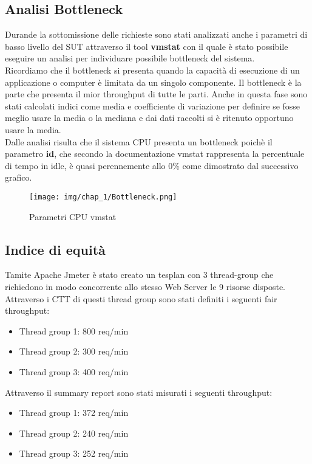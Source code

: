 \subsection{Analisi Bottleneck}
Durande la sottomissione delle richieste sono stati analizzati anche i parametri di basso livello del SUT attraverso il tool \textbf{vmstat} con il quale è stato possibile eseguire un analisi per individuare possibile bottleneck del sistema.\\
Ricordiamo che il bottleneck si presenta quando la capacità di esecuzione di un applicazione o computer è limitata da un singolo componente. Il bottleneck è la parte che presenta il mior throughput di tutte le parti. 
Anche in questa fase sono stati calcolati indici come media e coefficiente di variazione per definire se fosse meglio usare la media o la mediana e dai dati raccolti si è ritenuto opportuno usare la media.\\
Dalle analisi risulta che il sistema CPU presenta un bottleneck poichè il parametro \textbf{id}, che secondo la documentazione vmstat rappresenta la percentuale di tempo in idle, è quasi perennemente allo 0\% come dimostrato dal successivo grafico.
\begin{figure}[H]
    \centering
    \texttt{[image: img/chap\_1/Bottleneck.png]}
    \caption{Parametri CPU vmstat}
    \label{fig:bottleneck}
\end{figure}
\subsection{Indice di equità}
Tamite Apache Jmeter è stato creato un tesplan con 3 thread-group che richiedono in modo concorrente allo stesso Web Server le 9 risorse disposte.\\
Attraverso i CTT di questi thread group sono stati definiti i seguenti fair throughput:
\begin{itemize}
    \item Thread group 1: 800 req/min
    \item Thread group 2: 300 req/min
    \item Thread group 3: 400 req/min
\end{itemize}
Attraverso il summary report sono stati misurati i seguenti throughput:

\begin{itemize}
    \item Thread group 1: 372 req/min
    \item Thread group 2: 240 req/min
    \item Thread group 3: 252 req/min
\end{itemize}

